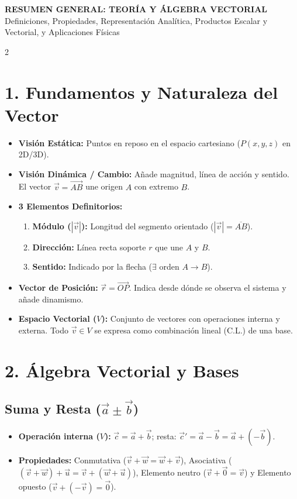 \documentclass[9pt,a4paper]{article}
\begin{document}
\begin{center}
    {\large \textbf{\textsf{RESUMEN GENERAL: TEORÍA Y ÁLGEBRA VECTORIAL}}}\\[2pt]
    {\footnotesize \textsf{Definiciones, Propiedades, Representación Analítica, Productos Escalar y Vectorial, y Aplicaciones Físicas}}
\end{center}
\vspace{-4pt}

\begin{multicols}{2}

\section{1. Fundamentos y Naturaleza del Vector}
\begin{itemize}
    \item \textbf{Visión Estática:} Puntos en reposo en el espacio cartesiano ($P(x,y,z)$ en 2D/3D).
    \item \textbf{Visión Dinámica / Cambio:} Añade magnitud, línea de acción y sentido. El vector $\vec{v} = \vec{AB}$ une origen $A$ con extremo $B$.
    \item \textbf{3 Elementos Definitorios:}
    \begin{enumerate}
        \item \textbf{Módulo ($|\vec{v}|$):} Longitud del segmento orientado ($|\vec{v}| = \overline{AB}$).
        \item \textbf{Dirección:} Línea recta soporte $r$ que une $A$ y $B$.
        \item \textbf{Sentido:} Indicado por la flecha ($\exists$ orden $A \to B$).
    \end{enumerate}
    \item \textbf{Vector de Posición:} $\vec{r} = \vec{OP}$. Indica desde dónde se observa el sistema y añade dinamismo.
    \item \textbf{Espacio Vectorial ($V$):} Conjunto de vectores con operaciones interna y externa. Todo $\vec{v} \in V$ se expresa como combinación lineal (C.L.) de una base.
\end{itemize}

\section{2. Álgebra Vectorial y Bases}
\subsection{Suma y Resta ($\vec{a} \pm \vec{b}$)}
\begin{itemize}
    \item \textbf{Operación interna ($V$):} $\vec{c} = \vec{a} + \vec{b}$; resta: $\vec{c}' = \vec{a} - \vec{b} = \vec{a} + (-\vec{b})$.
    \item \textbf{Propiedades:} Conmutativa ($\vec{v}+\vec{w}=\vec{w}+\vec{v}$), Asociativa ($(\vec{v}+\vec{w})+\vec{u}=\vec{v}+(\vec{w}+\vec{u})$), Elemento neutro ($\vec{v}+\vec{0}=\vec{v}$) y Elemento opuesto ($\vec{v}+(-\vec{v})=\vec{0}$).
\end{itemize}


\end{multicols}
\end{document}
